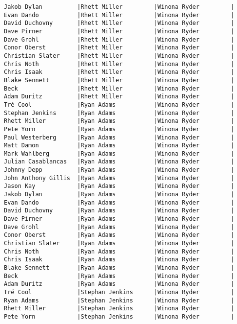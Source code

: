 \documentclass{article}
\begin{document}
\begin{verbatim}
Jakob Dylan          |Rhett Miller         |Winona Ryder         |
Evan Dando           |Rhett Miller         |Winona Ryder         |
David Duchovny       |Rhett Miller         |Winona Ryder         |
Dave Pirner          |Rhett Miller         |Winona Ryder         |
Dave Grohl           |Rhett Miller         |Winona Ryder         |
Conor Oberst         |Rhett Miller         |Winona Ryder         |
Christian Slater     |Rhett Miller         |Winona Ryder         |
Chris Noth           |Rhett Miller         |Winona Ryder         |
Chris Isaak          |Rhett Miller         |Winona Ryder         |
Blake Sennett        |Rhett Miller         |Winona Ryder         |
Beck                 |Rhett Miller         |Winona Ryder         |
Adam Duritz          |Rhett Miller         |Winona Ryder         |
Tré Cool             |Ryan Adams           |Winona Ryder         |
Stephan Jenkins      |Ryan Adams           |Winona Ryder         |
Rhett Miller         |Ryan Adams           |Winona Ryder         |
Pete Yorn            |Ryan Adams           |Winona Ryder         |
Paul Westerberg      |Ryan Adams           |Winona Ryder         |
Matt Damon           |Ryan Adams           |Winona Ryder         |
Mark Wahlberg        |Ryan Adams           |Winona Ryder         |
Julian Casablancas   |Ryan Adams           |Winona Ryder         |
Johnny Depp          |Ryan Adams           |Winona Ryder         |
John Anthony Gillis  |Ryan Adams           |Winona Ryder         |
Jason Kay            |Ryan Adams           |Winona Ryder         |
Jakob Dylan          |Ryan Adams           |Winona Ryder         |
Evan Dando           |Ryan Adams           |Winona Ryder         |
David Duchovny       |Ryan Adams           |Winona Ryder         |
Dave Pirner          |Ryan Adams           |Winona Ryder         |
Dave Grohl           |Ryan Adams           |Winona Ryder         |
Conor Oberst         |Ryan Adams           |Winona Ryder         |
Christian Slater     |Ryan Adams           |Winona Ryder         |
Chris Noth           |Ryan Adams           |Winona Ryder         |
Chris Isaak          |Ryan Adams           |Winona Ryder         |
Blake Sennett        |Ryan Adams           |Winona Ryder         |
Beck                 |Ryan Adams           |Winona Ryder         |
Adam Duritz          |Ryan Adams           |Winona Ryder         |
Tré Cool             |Stephan Jenkins      |Winona Ryder         |
Ryan Adams           |Stephan Jenkins      |Winona Ryder         |
Rhett Miller         |Stephan Jenkins      |Winona Ryder         |
Pete Yorn            |Stephan Jenkins      |Winona Ryder         |

\end{verbatim}
\end{document}
